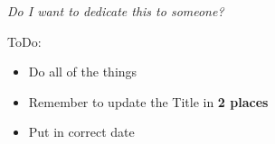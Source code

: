 \thispagestyle{empty}
{}

\vspace*{5cm}

\begin{center}
\textit{Do I want to dedicate this to someone?}


\end{center}

 \color{red}
 \begin{center}
 ToDo:

 \begin{itemize}
     \item Do all of the things
     \item Remember to update the Title in \textbf{2 places}
     \item Put in correct date
    
 \end{itemize}
 \end{center}

 \color{black}
